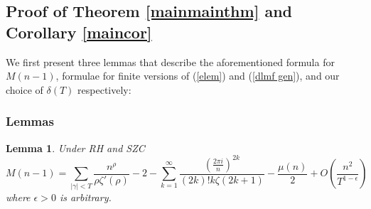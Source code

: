 \documentclass[11pt,article]{amsart}
\numberwithin{equation}{section}
\newtheorem{lemma}{Lemma}
\numberwithin{equation}{section}
\numberwithin{lemma}{section}
\numberwithin{prop}{section}
\begin{document}
\subsection{Proof of Theorem \ref{mainmainthm} and Corollary \ref{maincor}}
\label{sec2}
We first present three lemmas that describe the aforementioned formula for $M(n-1)$, formulae for finite versions of (\ref{elem}) and (\ref{dlmf gen}), and our choice of $\delta(T)$ respectively:
\subsubsection{Lemmas}
\begin{lemma}
Under RH and SZC 
\begin{equation}
M(n-1)=\sum_{\left|\gamma\right|<T}\frac{n^{\rho}}{\rho\zeta'(\rho)}-2-\sum_{k=1}^{\infty}\frac{\left(\frac{2\pi i}{n}\right)^{2k}}{(2k)!k\zeta(2k+1)}-\frac{\mu(n)}{2}+O\left(\frac{n^{2}}{T^{1-\epsilon}}\right) \label{mertens big}
\end{equation}
where $\epsilon>0$ is arbitrary. \label{titchlemma}
\end{lemma}
\end{document}
